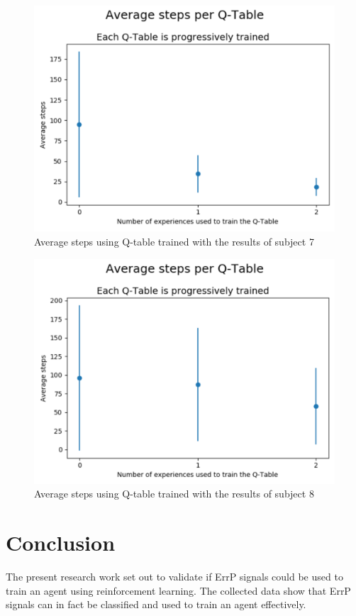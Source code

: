 \documentclass[journal]{IEEEtran}
\begin{document}
\begin{figure}[h]
        \centering
        \includegraphics[scale=0.4]{Images/Average_steps/nati.png} 
        \caption{Average steps using Q-table trained with the results of subject 7}
        \label{fig:avg_steps_7}
\end{figure}

\begin{figure}[h]
        \centering
        \includegraphics[scale=0.4]{Images/Average_steps/santiago.png} 
        \caption{Average steps using Q-table trained with the results of subject 8}
        \label{fig:avg_steps_8}
\end{figure}


\section{Conclusion}
The present research work set out to validate if ErrP signals could be used to train an agent using reinforcement learning. The collected data show that ErrP signals can in fact be classified and used to train an agent effectively. 
\end{document}
